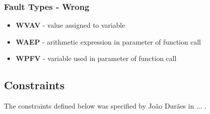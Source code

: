 \subsubsection{Fault Types - Wrong}
\begin{itemize}
	\item \textbf{WVAV} - value assigned to variable
	\item \textbf{WAEP} - arithmetic expression in parameter of function call
	\item \textbf{WPFV} - variable used in parameter of function call
\end{itemize}

\clearpage
\subsection{Constraints}

The constraints defined below was specified by João Durães in ... .

